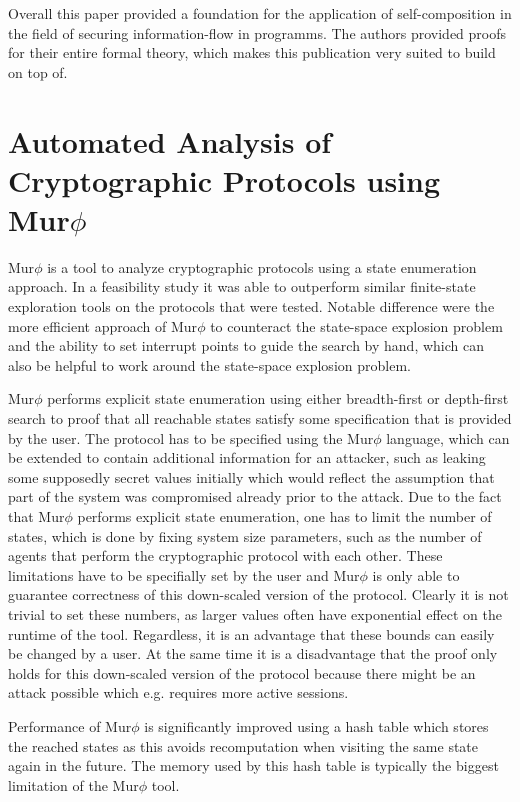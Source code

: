 \documentclass[a4paper,UKenglish]{lipics-v2018}
\def\murphi{Mur$\phi$ }
\begin{document}
Overall this paper provided a foundation for the application of self-composition in the field of securing information-flow in programms. The authors provided proofs for their entire formal theory, which makes this publication very suited to build on top of.




\section{Automated Analysis of Cryptographic Protocols using \murphi}

\murphi is a tool to analyze cryptographic protocols using a state enumeration approach. In a feasibility study it was able to outperform similar finite-state exploration tools on the protocols that were tested. Notable difference were the more efficient approach of \murphi to counteract the state-space explosion problem and the ability to set interrupt points to guide the search by hand, which can also be helpful to work around the state-space explosion problem.\cite{murphi}

\murphi performs explicit state enumeration using either breadth-first or depth-first search to proof that all reachable states satisfy some specification that is provided by the user. The protocol has to be specified using the \murphi language, which can be extended to contain additional information for an attacker, such as leaking some supposedly secret values initially which would reflect the assumption that part of the system was compromised already prior to the attack. Due to the fact that \murphi performs explicit state enumeration, one has to limit the number of states, which is done by fixing system size parameters, such as the number of agents that perform the cryptographic protocol with each other. These limitations have to be specifially set by the user and \murphi is only able to guarantee correctness of this down-scaled version of the protocol. Clearly it is not trivial to set these numbers, as larger values often have exponential effect on the runtime of the tool.\cite{murphi} Regardless, it is an advantage that these bounds can easily be changed by a user. At the same time it is a disadvantage that the proof only holds for this down-scaled version of the protocol because there might be an attack possible which e.g. requires more active sessions.

Performance of \murphi is significantly improved using a hash table which stores the reached states as this avoids recomputation when visiting the same state again in the future. The memory used by this hash table is typically the biggest limitation of the \murphi tool.\cite{murphi}
\end{document}
